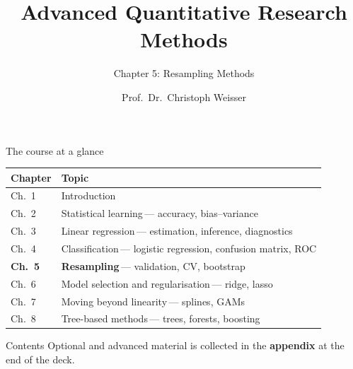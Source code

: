 \documentclass[aspectratio=169,11pt]{beamer}
\title{Advanced Quantitative Research Methods}
\subtitle{Chapter 5: Resampling Methods}
\author{Prof.\ Dr.\ Christoph Weisser}
\date{}\graphicspath{{images/}}
\begin{document}
\begin{frame}[plain]\titlepage\end{frame}

\begin{frame}{The course at a glance}
  \vspace{-1.5mm}
  \begin{center}
  \scriptsize
  \setlength{\tabcolsep}{5pt}
  \renewcommand{\arraystretch}{1.30}
  \begin{tabular}{@{\hspace{2pt}}l >{\raggedright\arraybackslash}p{}@{\hspace{2pt}}}
    \toprule
    \textbf{Chapter} & \textbf{Topic} \\
    \midrule
     {\color{accent}Ch.\ 1} & Introduction \\
    \rowcolor{black!3} {\color{accent}Ch.\ 2} & Statistical learning\,{\color{black!45}--- accuracy, bias--variance} \\
     {\color{accent}Ch.\ 3} & Linear regression\,{\color{black!45}--- estimation, inference, diagnostics} \\
    \rowcolor{black!3} {\color{accent}Ch.\ 4} & Classification\,{\color{black!45}--- logistic regression, confusion matrix, ROC} \\
    \rowcolor{accent!18} \textbf{Ch.\ 5} & \textbf{Resampling}\,{\color{accent!75!black}--- validation, CV, bootstrap} \\
    \rowcolor{black!3} {\color{accent}Ch.\ 6} & Model selection and regularisation\,{\color{black!45}--- ridge, lasso} \\
     {\color{accent}Ch.\ 7} & Moving beyond linearity\,{\color{black!45}--- splines, GAMs} \\
    \rowcolor{black!3} {\color{accent}Ch.\ 8} & Tree-based methods\,{\color{black!45}--- trees, forests, boosting} \\
    \bottomrule
  \end{tabular}
  \end{center}
\end{frame}


\begin{frame}{Contents}\small
  \tableofcontents[hideallsubsections]
  \vfill
  {\tiny Optional and advanced material is collected in the \textbf{appendix} at the end of the deck.}
\end{frame}
\end{document}
